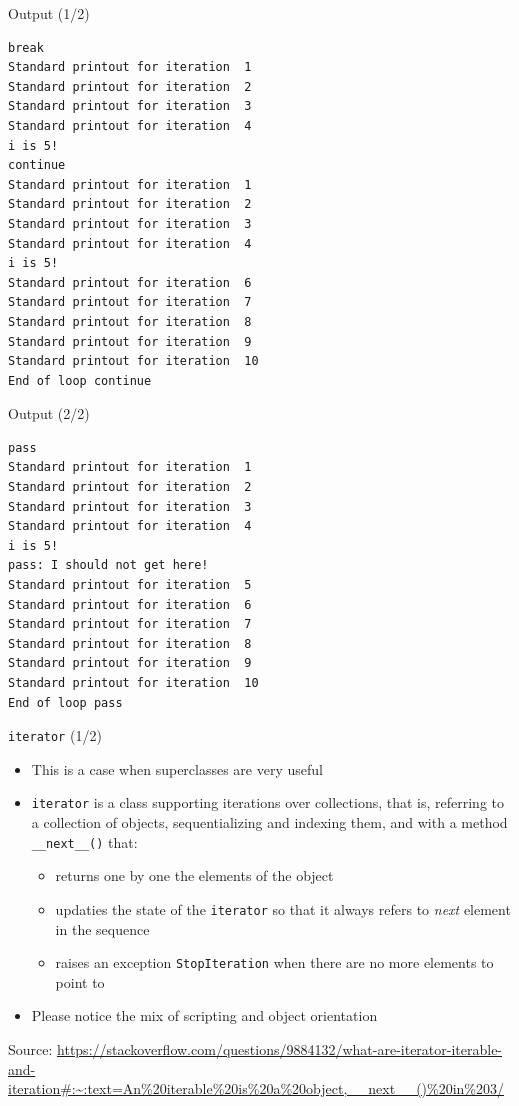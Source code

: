 \documentclass{beamer}
\begin{document}
\begin{frame}[fragile]
{\centerline{Output (1/2)}}
\begin{lstlisting}[style=myPythonStyle]
break
Standard printout for iteration  1
Standard printout for iteration  2
Standard printout for iteration  3
Standard printout for iteration  4
i is 5!
continue
Standard printout for iteration  1
Standard printout for iteration  2
Standard printout for iteration  3
Standard printout for iteration  4
i is 5!
Standard printout for iteration  6
Standard printout for iteration  7
Standard printout for iteration  8
Standard printout for iteration  9
Standard printout for iteration  10
End of loop continue
\end{lstlisting}

\end{frame}

\begin{frame}[fragile]
{\centerline{Output (2/2)}}
\begin{lstlisting}[style=myPythonStyle]
pass
Standard printout for iteration  1
Standard printout for iteration  2
Standard printout for iteration  3
Standard printout for iteration  4
i is 5!
pass: I should not get here!
Standard printout for iteration  5
Standard printout for iteration  6
Standard printout for iteration  7
Standard printout for iteration  8
Standard printout for iteration  9
Standard printout for iteration  10
End of loop pass
\end{lstlisting}

\end{frame}

\begin{frame}[fragile]
{\centerline{\texttt{iterator} (1/2)}}
\begin{itemize}
    \item This is a case when superclasses are very useful
    \item \texttt{iterator} is a class supporting iterations over collections, that is, referring to a collection of objects, sequentializing and indexing them, and with a method \texttt{\_\_next\_\_()} that:
 \begin{itemize}
    \item  returns one by one the elements of the object
    \item updaties the state of the \texttt{iterator} so that it always refers to \textit{next} element in the sequence
    \item raises an exception  \texttt{StopIteration} when there are no more elements to point to
    \end{itemize}
    \item Please notice the mix of scripting and object orientation
        \end{itemize}
\begin{center}
\tiny Source: \url{https://stackoverflow.com/questions/9884132/what-are-iterator-iterable-and-iteration#:~:text=An%20iterable%20is%20a%20object,__next__()%20in%203/}
\end{center}

\end{frame}
\end{document}
